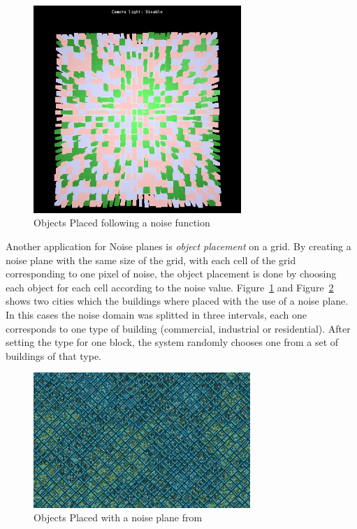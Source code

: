 \begin{figure}[htbp]
    \centering
    \includegraphics[width=0.7\textwidth]{images/Theory/Perlin_Noise/AppletNoName201501191604.png}
    \caption{Objects Placed following a noise function}
    \label{fig:MyNCity}
\end{figure}

Another application for Noise planes is \emph{object placement} on a grid. By creating a noise plane with the same size of the grid, with each cell of the grid corresponding to one pixel of noise, the object placement is done by choosing each object for each cell according to the noise value. Figure~\ref{fig:MyNCity} and
Figure~\ref{fig:NCity} shows two cities which the buildings where placed with the use of a noise plane. In this cases the noise domain was splitted in three intervals, each one corresponds to one type of building (commercial, industrial or residential). After setting the type for one block, the system randomly chooses one from a set of buildings of that type.


\begin{figure}[]
	\centering
	\includegraphics[width=0.73\textwidth]{images/Theory/Perlin_Noise/NoisyCity.jpg}
	\caption{Objects Placed with a noise plane from \cite{NoisesGAMES}}
	\label{fig:NCity}
\end{figure}

